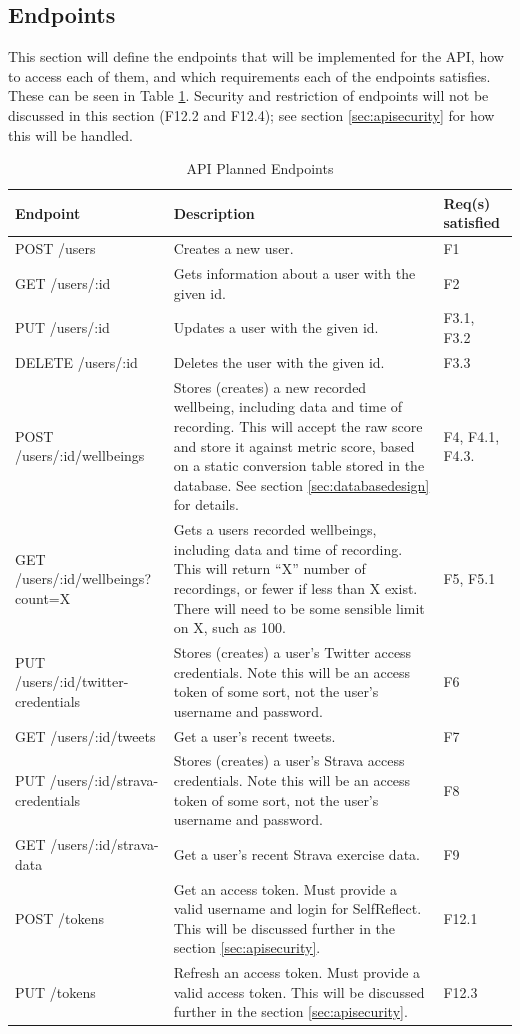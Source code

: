 \documentclass[11pt,openright,a4paper]{report}
\begin{document}
\newpage
\subsection{Endpoints}
This section will define the endpoints that will be implemented for the API,  how to access each of them, and which requirements each of the endpoints satisfies. These can be seen in Table \ref{tab:designendpoints}. Security and restriction of endpoints will not be discussed in this section (F12.2 and F12.4); see section \ref{sec:apisecurity} for how this will be handled.

\begin{longtable}{| p{6cm} | p{6cm} | p{2cm} |}
\caption{API Planned Endpoints}
\label{tab:designendpoints} \\
\hline
\textbf{Endpoint} & \textbf{Description} & \textbf{Req(s) satisfied} \\ \hline
POST /users & Creates a new user. & F1 \\ \hline
GET /users/:id & Gets information about a user with the given id. & F2 \\ \hline
PUT /users/:id & Updates a user with the given id. & F3.1, F3.2 \\ \hline
DELETE /users/:id & Deletes the user with the given id. & F3.3 \\ \hline
POST /users/:id/wellbeings & Stores (creates) a new recorded wellbeing, including data and time of recording. This will accept the raw score and store it against metric score, based on a static conversion table stored in the database. See section \ref{sec:databasedesign} for details. & F4, F4.1, F4.3. \\ \hline
GET /users/:id/wellbeings?count=X & Gets a users recorded wellbeings, including data and time of recording. This will return \enquote{X} number of recordings, or fewer if less than X exist. There will need to be some sensible limit on X, such as 100. & F5, F5.1\\ \hline
PUT /users/:id/twitter-credentials & Stores (creates) a user's Twitter access credentials. Note this will be an access token of some sort, not the user's username and password. & F6 \\ \hline
GET /users/:id/tweets & Get a user's recent tweets. & F7 \\ \hline
PUT /users/:id/strava-credentials  & Stores (creates) a user's Strava access credentials. Note this will be an access token of some sort, not the user's username and password.& F8 \\ \hline
GET /users/:id/strava-data  & Get a user's recent Strava exercise data. & F9 \\ \hline
POST /tokens & Get an access token. Must provide a valid username and login for SelfReflect. This will be discussed further in the section \ref{sec:apisecurity}. & F12.1 \\ \hline
PUT /tokens & Refresh an access token. Must provide a valid access token. This will be discussed further in the section \ref{sec:apisecurity}. & F12.3 \\ \hline
\end{longtable}
\end{document}
